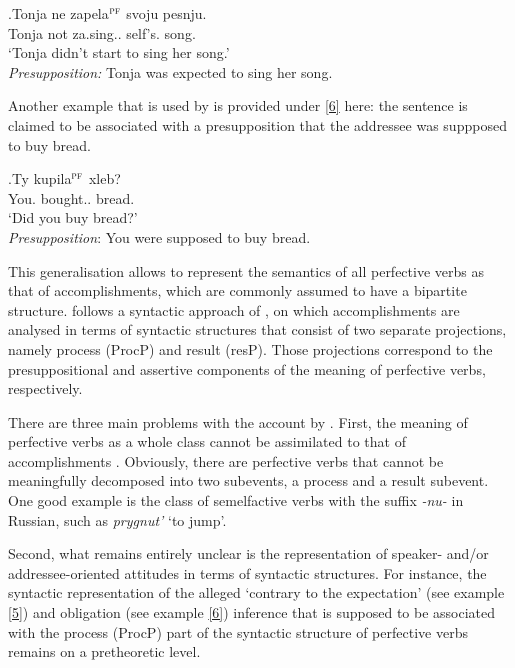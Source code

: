 \exg.\label{5}Tonja ne zapela$^{\textsc{pf}}$ svoju pesnju.\\
Tonja not za.sing.. self's. song.\\
\trans `Tonja didn't start to sing her song.'\\
\textit{Presupposition:} Tonja was expected to sing her song.\\

Another example that is used by \citet{Romanova:06} is provided under \ref{6} here: the sentence is claimed to be associated with a presupposition that the addressee was suppposed to buy bread.

\exg.\label{6}Ty kupila$^{\textsc{pf}}$ xleb?\\
You. bought.. bread.\\
\trans `Did you buy bread?'\\
\textit{Presupposition}: You were supposed to buy bread.\\

This generalisation allows \citet{Romanova:06} to represent the semantics of all perfective verbs as that of accomplishments, which are commonly assumed to have a bipartite structure. \citet{Romanova:06} follows a syntactic approach of \citet{Ramchand:04}, on which accomplishments are analysed in terms of syntactic structures that consist of two separate projections, namely process (ProcP) and result (resP). Those projections correspond to the presuppositional and assertive components of the meaning of perfective verbs, respectively. 

There are three main problems with the account by \citet{Romanova:06}. First, the meaning of perfective verbs as a whole class cannot be assimilated to that of accomplishments \citep[for counterarguments see][]{Filip:00, FilipRothstein:05}. Obviously, there are perfective verbs that cannot be meaningfully decomposed into two subevents, a process and a result subevent. One good example is the class of semelfactive verbs with the suffix \textit{-nu-} in Russian, such as \textit{prygnut'} `to jump'. 

 Second, what remains entirely unclear is the representation of speaker- and/or addressee-oriented attitudes in terms of syntactic structures. For instance, the syntactic representation of the alleged `contrary to the expectation' (see example \ref{5}) and obligation (see example \ref{6}) inference that is supposed to be associated with the process (ProcP) part of the syntactic structure of perfective verbs remains on a pretheoretic level.

